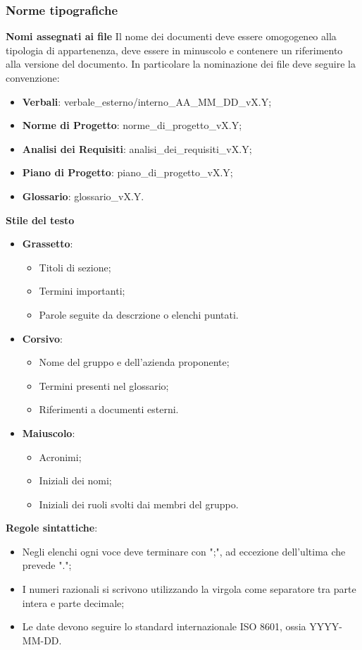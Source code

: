 \subsubsection{Norme tipografiche}
\textbf{Nomi assegnati ai file} Il nome dei documenti deve essere omogogeneo alla tipologia di appartenenza, deve essere in minuscolo
e contenere un riferimento alla versione del documento. In particolare la nominazione dei file deve seguire la convenzione:
\begin{itemize}
	\item \textbf{Verbali}: verbale\_esterno/interno\_AA\_MM\_DD\_vX.Y;
	\item \textbf{Norme di Progetto}: norme\_di\_progetto\_vX.Y;
	\item \textbf{Analisi dei Requisiti}: analisi\_dei\_requisiti\_vX.Y;
	\item \textbf{Piano di Progetto}: piano\_di\_progetto\_vX.Y;
	\item \textbf{Glossario}: glossario\_vX.Y.
\end{itemize}
\textbf{Stile del testo}
\begin{itemize}
	\item \textbf{Grassetto}:
	      \begin{itemize}
		      \item Titoli di sezione;
		      \item Termini importanti;
		      \item Parole seguite da descrzione o elenchi puntati.
	      \end{itemize}
	\item \textbf{Corsivo}:
	      \begin{itemize}
		      \item Nome del gruppo e dell'azienda proponente;
		      \item Termini presenti nel glossario;
		      \item Riferimenti a documenti esterni.
	      \end{itemize}
	\item \textbf{Maiuscolo}:
	      \begin{itemize}
		      \item Acronimi;
		      \item Iniziali dei nomi;
		      \item Iniziali dei ruoli svolti dai membri del gruppo.
	      \end{itemize}
\end{itemize}
\textbf{Regole sintattiche}:
\begin{itemize}
	\item Negli elenchi ogni voce deve terminare con ";", ad eccezione dell'ultima che prevede ".";
	\item I numeri razionali si scrivono utilizzando la virgola come separatore tra parte intera e parte decimale;
	\item Le date devono seguire lo standard internazionale ISO 8601, ossia YYYY-MM-DD.
\end{itemize}

